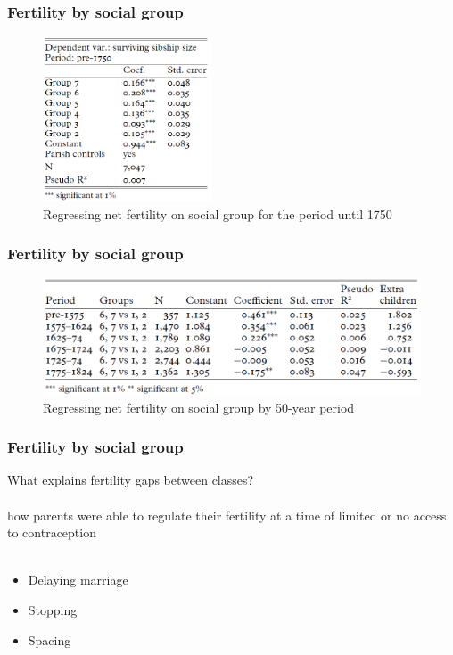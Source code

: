 \documentclass[pdftex,12pt,xcolor=pdftex,table]{beamer}
\begin{document}
\begin{frame}
\frametitle{Fertility by social group}
\begin{figure}[h!]
    \centering
    \includegraphics[width=5cm]{table4.PNG}
    \caption{Regressing net fertility on social group for the period until 1750}
 \end{figure}
\end{frame}
\begin{frame}
\frametitle{Fertility by social group}
\begin{figure}[h!]
    \centering
    \includegraphics[width=12cm]{table5.PNG}
    \caption{Regressing net fertility on social group by 50-year period}
 \end{figure}
\end{frame}
\begin{frame}
\frametitle{Fertility by social group}
What explains fertility gaps between classes?\\~\\
    how parents were able to regulate their fertility at a time of limited or no access to contraception\\~\\
    \begin{itemize}
        \item Delaying marriage
        \item Stopping
        \item Spacing 
    \end{itemize}\\~\\
\end{frame}
\end{document}
